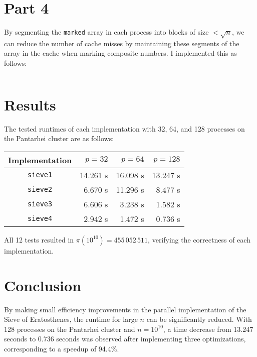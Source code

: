 \documentclass[12pt,letterpaper,oneside]{article}
\begin{document}
\section*{Part 4}
By segmenting the \texttt{marked} array in each process into blocks of size $<\sqrt n$, we can reduce the number of cache misses by maintaining these segments of the array in the cache when marking composite numbers. I implemented this as follows:
\inputminted[tabsize=2,fontsize=\small]{c}{segments.c}

\section*{Results}
The tested runtimes of each implementation with 32, 64, and 128 processes on the Pantarhei cluster are as follows:

\begin{center}
	\begin{tabular}{c | r r r}
		Implementation & $p=32$ & $p=64$ & $p=128$ \\
		\hline
		\texttt{sieve1} & 14.261 s & 16.098 s & 13.247 s \\
		\texttt{sieve2} & 6.670 s & 11.296 s & 8.477 s \\
		\texttt{sieve3} & 6.606 s & 3.238 s & 1.582 s \\
		\texttt{sieve4} & 2.942 s & 1.472 s & 0.736 s
	\end{tabular}
\end{center}

\noindent
All 12 tests resulted in $\pi(10^{10})=455\,052\,511$, verifying the correctness of each implementation.

\section*{Conclusion}
By making small efficiency improvements in the parallel implementation of the Sieve of Eratosthenes, the runtime for large $n$ can be significantly reduced. With 128 processes on the Pantarhei cluster and $n=10^{10}$, a time decrease from 13.247 seconds to 0.736 seconds was observed after implementing three optimizations, corresponding to a speedup of 94.4\%.
\end{document}
